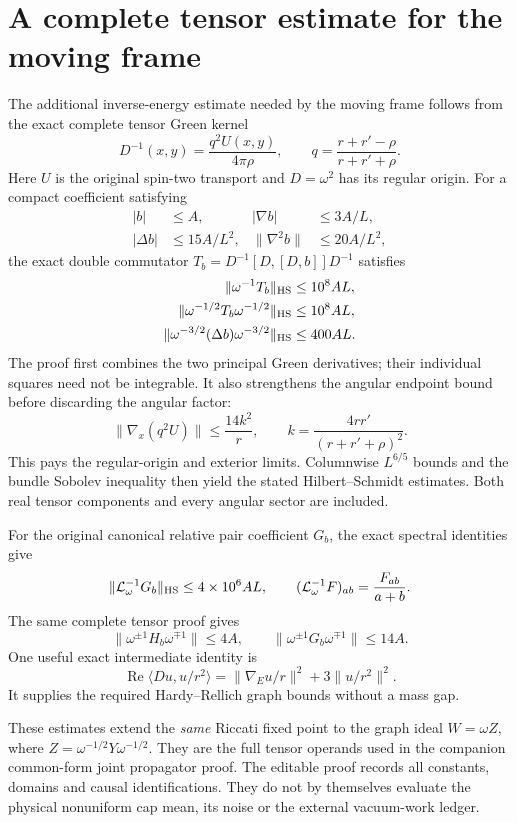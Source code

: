\section{A complete tensor estimate for the moving frame}
The additional inverse-energy estimate needed by the moving frame follows
from the exact complete tensor Green kernel
\[
 D^{-1}(x,y)=\frac{q^2U(x,y)}{4\pi\rho},\qquad
 q=\frac{r+r'-\rho}{r+r'+\rho}.
\]
Here $U$ is the original spin-two transport and $D=\omega^2$ has its
regular origin.  For a compact coefficient satisfying
\begin{align*}
 |b|&\le A,& |\nabla b|&\le3A/L,\\
 |\Delta b|&\le15A/L^2,&
 \|\nabla^2b\|&\le20A/L^2,
\end{align*}
the exact double commutator
$T_b=D^{-1}[D,[D,b]]D^{-1}$ satisfies
\begin{align*}
 \|\omega^{-1}T_b\|_{\rm HS}&\le10^8AL,\\
 \|\omega^{-1/2}T_b\omega^{-1/2}\|_{\rm HS}
                                      &\le10^8AL,\\
 \|\omega^{-3/2}(\Delta b)\omega^{-3/2}\|_{\rm HS}
                                      &\le400AL.
\end{align*}
The proof first combines the two principal Green derivatives; their
individual squares need not be integrable.  It also strengthens the
angular endpoint bound before discarding the angular factor:
\[
 \|\nabla_x(q^2U)\|\le\frac{14k^2}{r},\qquad
 k=\frac{4rr'}{(r+r'+\rho)^2}.
\]
This pays the regular-origin and exterior limits.  Columnwise
$L^{6/5}$ bounds and the bundle Sobolev inequality then yield the stated
Hilbert--Schmidt estimates.  Both real tensor components and every angular
sector are included.

For the original canonical relative pair coefficient $G_b$, the exact
spectral identities give
\[
 \|\mathcal L_\omega^{-1}G_b\|_{\rm HS}
       \le4\times10^6AL,\qquad
 (\mathcal L_\omega^{-1}F)_{ab}=\frac{F_{ab}}{a+b}.
\]
The same complete tensor proof gives
\[
 \|\omega^{\pm1}H_b\omega^{\mp1}\|\le4A,\qquad
 \|\omega^{\pm1}G_b\omega^{\mp1}\|\le14A.
\]
One useful exact intermediate identity is
\[
 \operatorname{Re}\langle Du,u/r^2\rangle
   =\|\nabla_Eu/r\|^2+3\|u/r^2\|^2.
\]
It supplies the required Hardy--Rellich graph bounds without a mass gap.

These estimates extend the \emph{same} Riccati fixed point to the graph
ideal $W=\omega Z$, where
$Z=\omega^{-1/2}Y\omega^{-1/2}$.
They are the full tensor operands used in the companion common-form joint
propagator proof.  The editable proof records all constants, domains and
causal identifications.  They do not by themselves evaluate the physical
nonuniform cap mean, its noise or the external vacuum-work ledger.

